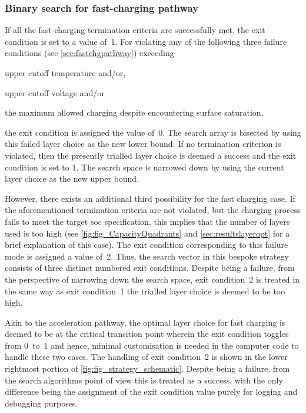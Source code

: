 \subsubsection*{Binary search for fast-charging pathway}

If all  the fast-charging  termination criteria are  successfully met,  the exit
condition is  set to  a value  of~1. For  violating any  of the  following three
failure conditions (see \cref{sec:fastchgpathway}) \viz{} exceeding
\begin{enumerate*}[label=\itshape\alph*\upshape)]
    \item upper cutoff temperature  and/or,
    \item upper cutoff voltage and/or
    \item the maximum allowed charging despite encountering surface saturation,
\end{enumerate*}
the exit condition is  assigned the value of~0. The search  array is bisected by
using  this failed  layer  choice as  the  new lower  bound.  If no  termination
criterion is  violated, then  the presently  trialled layer  choice is  deemed a
success and the exit condition is set to 1. The search space is narrowed down by
using the current layer choice as the new upper bound.

However,  there exists  an additional  third possibility  for the  fast charging
case.  If the  aforementioned termination  criteria  are not  violated, but  the
charging process fails to meet  the target \gls{soc} specification, this implies
that the number of layers used is too high (see \cref{fig:fig_CapacityQuadrants}
and \cref{sec:resultslayeropt} for  a brief explanation of this  case). The exit
condition corresponding to this failure mode is assigned a value of~2. Thus, the
search vector in this bespoke strategy  consists of three distinct numbered exit
conditions. Despite being a failure, from  the perspective of narrowing down the
search space,  exit condition~2 is treated  in the same way  as exit condition~1
\ie{} the trialled layer choice is deemed to be too high.

Akin to the acceleration pathway, the  optimal layer choice for fast charging is
deemed to be at the critical transition point wherein the exit condition toggles
from 0~to~1 and  hence, minimal customisation is needed in  the computer code to
handle these two cases.  The handling of exit condition~2 is  shown in the lower
rightmost portion of \cref{fig:fig_strategy_schematic}. Despite being a failure,
from the search algorithms point of view  this is treated as a success, with the
only difference  being the  assignment of  the exit  condition value  purely for
logging and debugging purposes.

